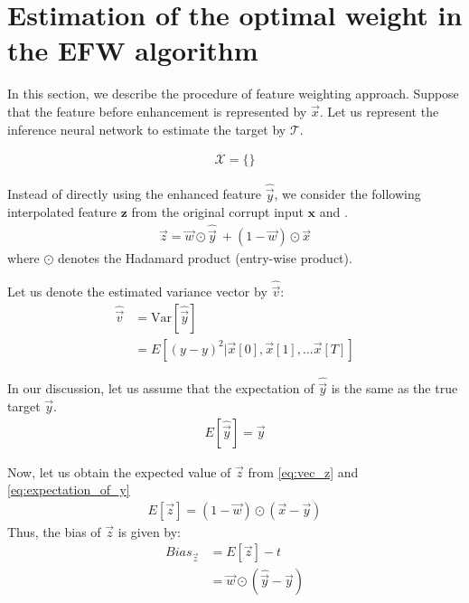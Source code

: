 \documentclass{article}
\begin{document}
\section{Estimation of the optimal weight in the EFW algorithm}
In this section, we describe the procedure of feature weighting approach.
Suppose that the feature before enhancement is represented by $\vec{x}$.
Let us represent the inference neural network to estimate the target by
$\mathcal{T}$.

\begin{align}
  \mathcal{X} = \{  \}
\end{align}

Instead of directly using the enhanced feature $\widehat{\vec{y}}$, we consider
the following interpolated feature $\bm{z}$ from the original corrupt
input $\bm{x}$ and .
\begin{align}
  \vec{z} = \vec{w} \odot \widehat{\vec{y}} \ + (1 - \vec{w}) \odot \vec{x} 
    \label{eq:vec_z}
\end{align}
where $\odot$ denotes the Hadamard product (entry-wise product).

Let us denote the estimated variance vector by $\hat{\vec{v}}$:
\begin{align}
  \hat{\vec{v}} & = \text{Var}[\widehat{\vec{y}}] \nonumber \\
                & = E[(y - y)^2 | \vec{x}[0], \vec{x}[1], ... \vec{x}[T]]
     \label{eq:vec_v}
\end{align}

In our discussion, let us assume that the expectation of $\hat{\vec{y}}$ is the
same as the true target $\vec{y}$.
\begin{align}
  E[\widehat{\vec{y}}] = \vec{y}  \label{eq:expectation_of_y}
\end{align}

Now, let us obtain the expected value of $\vec{z}$ from
\eqref{eq:vec_z} and \eqref{eq:expectation_of_y}
\begin{align}
  E[\vec{z}] = (1 - \vec{w}) \odot (\vec{x} - \vec{y})
\end{align}
Thus, the bias of $\vec{z}$ is given by:
\begin{align}
  Bias_{\vec{z}} & = E[\vec{z}] - t \nonumber \\
                 & = \vec{w} \odot (\widehat{\vec{y}} - \vec{y})
\end{align}
\end{document}
